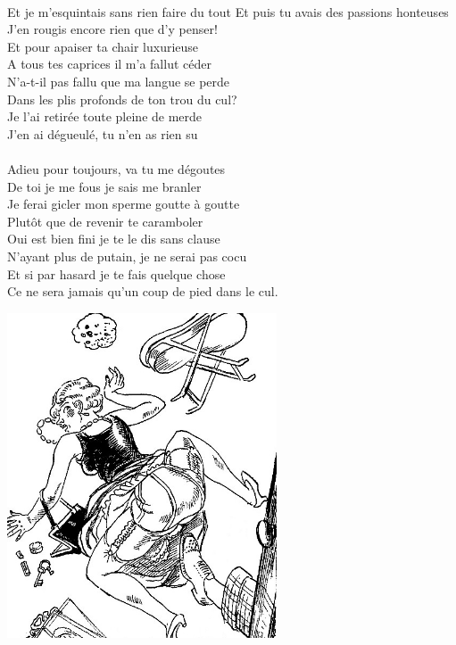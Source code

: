 \\Et je m'esquintais sans rien faire du tout
\breakpage
Et puis tu avais des passions honteuses
\\J'en rougis encore rien que d'y penser!
\\Et pour apaiser ta chair luxurieuse
\\A tous tes caprices il m'a fallut céder
\\N'a-t-il pas fallu que ma langue se perde
\\Dans les plis profonds de ton trou du cul?
\\Je l'ai retirée toute pleine de merde
\\J'en ai dégueulé, tu n'en as rien su
\\\\Adieu pour toujours, va tu me dégoutes
\\De toi je me fous je sais me branler
\\Je ferai gicler mon sperme goutte à goutte
\\Plutôt que de revenir te caramboler
\\Oui est bien fini je te le dis sans clause
\\N'ayant plus de putain, je ne serai pas cocu
\\Et si par hasard je te fais quelque chose
\\Ce ne sera jamais qu'un coup de pied dans le cul.
\\
\bigskip
\begin{center}
\includegraphics[width=0.6\textwidth]{images/StancesASophie.jpg}
\end{center}

\breakpage